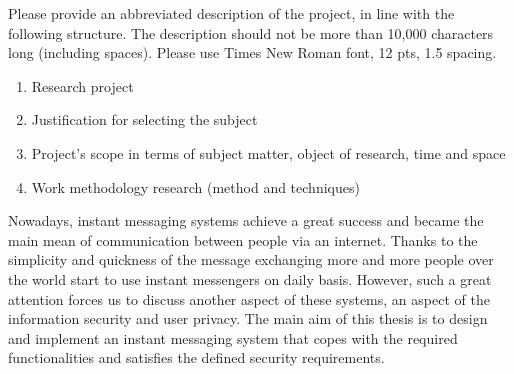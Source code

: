 Please provide an abbreviated description of the project, in line with the following structure.
The description should not be more than 10,000 characters long (including spaces).
Please use Times New Roman font, 12 pts, 1.5 spacing.
\begin{enumerate}
    \item Research project
    \item Justification for selecting the subject
    \item Project's scope in terms of subject matter, object of research, time and space
    \item Work methodology research (method and techniques)
\end{enumerate}

Nowadays, instant messaging systems achieve a great success and became the main mean of communication
between people via an internet.
Thanks to the simplicity and quickness of the message exchanging more and more people over the world start to use
instant messengers on daily basis.
However, such a great attention forces us to discuss another aspect of these systems, an aspect of the
information security and user privacy.
The main aim of this thesis is to design and implement an instant messaging system
that copes with the required functionalities and satisfies the defined security requirements.